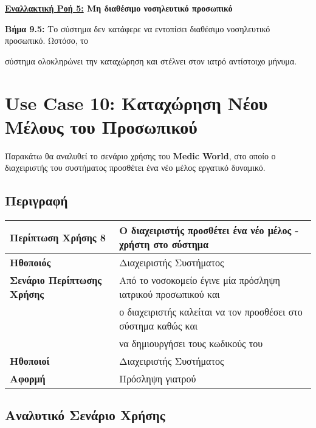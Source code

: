 \documentclass{article}
\newcommand\T{\rule{0pt}{2.6ex}}       %
\newcommand\B{\rule[-1.2ex]{0pt}{0pt}}
\begin{document}
\textbf{\underline{Εναλλακτική Ροή 5:} Μη διαθέσιμο νοσηλευτικό προσωπικό} \vspace{0.2cm}
\par \textbf{Βήμα 9.5:} Το σύστημα δεν κατάφερε να εντοπίσει διαθέσιμο νοσηλευτικό προσωπικό. Ωστόσο, το \par σύστημα ολοκληρώνει την καταχώρηση και στέλνει στον ιατρό αντίστοιχο μήνυμα. \vspace{0.1cm}


 \section{Use Case 10: Καταχώρηση Νέου Μέλους του Προσωπικού}

Παρακάτω θα αναλυθεί το σενάριο χρήσης του \textbf{Medic World}, στο οποίο ο διαχειριστής του συστήματος προσθέτει ένα νέο μέλος εργατικό δυναμικό.

\subsection{Περιγραφή}

\begin{center}
     \begin{tabular}{|l|l|}
     \hline
      \textbf{Περίπτωση Χρήσης 8} & Ο διαχειριστής προσθέτει ένα νέο μέλος - χρήστη στο σύστημα \T\B \\ 
      \hline
      \textbf{Ηθοποιός} & Διαχειριστής Συστήματος \T\B \\
      \hline
      \textbf{Σενάριο Περίπτωσης Χρήσης} & Από το νοσοκομείο έγινε μία πρόσληψη ιατρικού προσωπικού και \T \\& ο διαχειριστής καλείται να τον προσθέσει στο σύστημα καθώς και \\& να δημιουργήσει τους κωδικούς του \B \\
      \hline
      \textbf{Ηθοποιοί} & Διαχειριστής Συστήματος \T\B \\
      \hline
      \textbf{Αφορμή} & Πρόσληψη γιατρού \T\B \\
      \hline
     \end{tabular}
 \end{center}
 
\subsection{Αναλυτικό Σενάριο Χρήσης}
\end{document}
